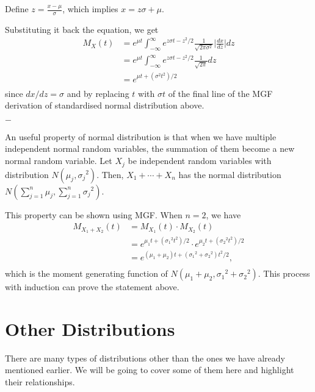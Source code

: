 \documentclass[11pt, a4paper, oneside]{book}
\theoremstyle{definition}
\newcommand{\breaking}{%
    \begin{center}
    $-$
    \end{center}%
}
\begin{document}
\noindent Define $z = \frac{x - \mu}{\sigma}$, which implies $x = z\sigma + \mu$.

\noindent Substituting it back the equation, we get 
\begin{equation*}
\begin{split}
M_X(t) &= e^{\mu t} \int_{-\infty}^{\infty} e^{z\sigma t - z^2/2} \frac{1}{\sqrt{2\pi\sigma^2}} \Big|\frac{dx}{dz}\Big| dz \\
&= e^{\mu t} \int_{-\infty}^{\infty} e^{z\sigma t - z^2/2}\frac{1}{\sqrt{2\pi}} dz \\
&= e^{\mu t + ({\sigma}^2t^2)/2} \\
\end{split}
\end{equation*}
since $dx/dz = \sigma$ and by replacing $t$ with $\sigma t$ of the final line of the MGF derivation of standardised normal distribution above. 

\breaking

\noindent An useful property of normal distribution is that when we have multiple independent normal random variables, the summation of them become a new normal random variable. Let $X_j$ be independent random variables with distribution $N(\mu_j, {\sigma_j}^2)$. Then, $X_1 + \cdots + X_n$ has the normal distribution $N(\sum_{j=1}^n \mu_j, \sum_{j=1}^n {\sigma_j}^2)$.

\noindent This property can be shown using MGF. When $n=2$, we have
\begin{equation*}
\begin{split}
M_{X_1 + X_2}(t) &= M_{X_1}(t) \cdot M_{X_2}(t) \\ 
&= e^{\mu_1 t + ({\sigma_1}^2t^2)/2} \cdot e^{\mu_2 t + ({\sigma_2}^2t^2)/2} \\
&= e^{(\mu_1 + \mu_2) t + ({\sigma_1}^2+{\sigma_2}^2)t^2/2}, \\
\end{split}
\end{equation*}
which is the moment generating function of $N(\mu_1 + \mu_2, {\sigma_1}^2+{\sigma_2}^2)$. This process with induction can prove the statement above. 

\section{Other Distributions}

\noindent There are many types of distributions other than the ones we have already mentioned earlier. We will be going to cover some of them here and highlight their relationships. 
\end{document}

